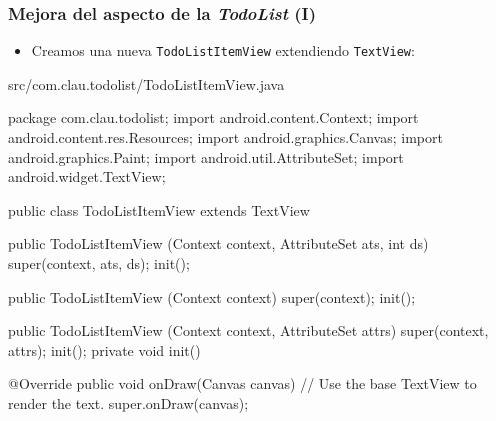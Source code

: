\documentclass[hyperref={pdfpagelabels=true},ucs]{beamer}
\begin{document}
\begin{frame}[fragile,shrink=10]
\frametitle{Mejora del aspecto de la \emph{TodoList} (I)}

\begin{itemize}
\item Creamos una nueva \verb|TodoListItemView| extendiendo \verb|TextView|:
\end{itemize}

\begin{tiny}
\begin{block}{src/com.clau.todolist/TodoListItemView.java}
\begin{java}
package com.clau.todolist;
import android.content.Context;
import android.content.res.Resources;
import android.graphics.Canvas;
import android.graphics.Paint;
import android.util.AttributeSet;
import android.widget.TextView;

public class TodoListItemView extends TextView {
  public TodoListItemView (Context context, AttributeSet ats, int ds) {
    super(context, ats, ds);
    init();
  }

  public TodoListItemView (Context context) {
    super(context);
    init();
  }

  public TodoListItemView (Context context, AttributeSet attrs) {
    super(context, attrs);
    init();
  }
  private void init() {
  }

  @Override
  public void onDraw(Canvas canvas) {
    // Use the base TextView to render the text.
    super.onDraw(canvas);
  }
}
\end{java}
\end{block}
\end{tiny}


\end{frame}
\end{document}
